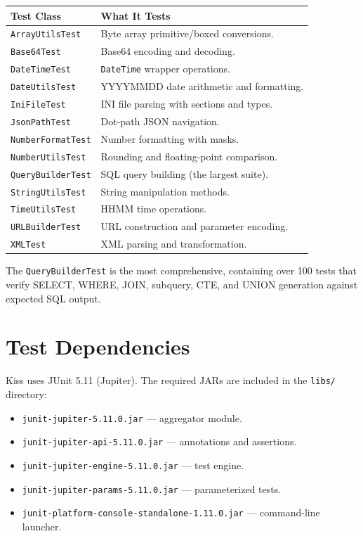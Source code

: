 \begin{longtable}{P{4.5cm}P{6cm}}
\toprule
\textbf{Test Class} & \textbf{What It Tests} \\
\midrule
\endhead
\texttt{ArrayUtilsTest} & Byte array primitive/boxed conversions. \\
\texttt{Base64Test} & Base64 encoding and decoding. \\
\texttt{DateTimeTest} & \texttt{DateTime} wrapper operations. \\
\texttt{DateUtilsTest} & YYYYMMDD date arithmetic and formatting. \\
\texttt{IniFileTest} & INI file parsing with sections and types. \\
\texttt{JsonPathTest} & Dot-path JSON navigation. \\
\texttt{NumberFormatTest} & Number formatting with masks. \\
\texttt{NumberUtilsTest} & Rounding and floating-point comparison. \\
\texttt{QueryBuilderTest} & SQL query building (the largest suite). \\
\texttt{StringUtilsTest} & String manipulation methods. \\
\texttt{TimeUtilsTest} & HHMM time operations. \\
\texttt{URLBuilderTest} & URL construction and parameter encoding. \\
\texttt{XMLTest} & XML parsing and transformation. \\
\bottomrule
\end{longtable}

\noindent
The \texttt{QueryBuilderTest} is the most comprehensive, containing over 100 tests that verify SELECT, WHERE, JOIN, subquery, CTE, and UNION generation against expected SQL output.

\section{Test Dependencies}
\label{sec:test-deps}

Kiss uses JUnit 5.11 (Jupiter).  The required JARs are included in the \texttt{libs/} directory:

\begin{itemize}
  \item \texttt{junit-jupiter-5.11.0.jar} --- aggregator module.
  \item \texttt{junit-jupiter-api-5.11.0.jar} --- annotations and assertions.
  \item \texttt{junit-jupiter-engine-5.11.0.jar} --- test engine.
  \item \texttt{junit-jupiter-params-5.11.0.jar} --- parameterized tests.
  \item \texttt{junit-platform-console-standalone-1.11.0.jar} --- command-line launcher.
\end{itemize}

